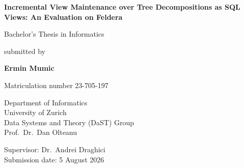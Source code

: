 \begin{titlepage}
    \centering
    \vspace*{2.5cm}

    {\LARGE\bfseries Incremental View Maintenance over Tree Decompositions as SQL Views: An Evaluation on Feldera\par}

    \vspace{1.5cm}

    \vfill

    {\Large Bachelor's Thesis in Informatics\par}
    \vspace{0.5cm}
    {\large submitted by}\\[0.3cm]
    {\Large\bfseries Ermin Mumic\par}
    {\large Matriculation number 23-705-197\par}

    \vfill

    \vspace{0.5cm}

    {\Large
    Department of Informatics\\
    University of Zurich\\[0.3cm]
    Data Systems and Theory (DaST) Group\\
    Prof.\ Dr.\ Dan Olteanu\par}

    \vspace{0.8cm}

    {\large
    Supervisor: Dr.\ Andrei Draghici\\[0.3cm]
    Submission date: 5 August 2026\par}

\end{titlepage}
